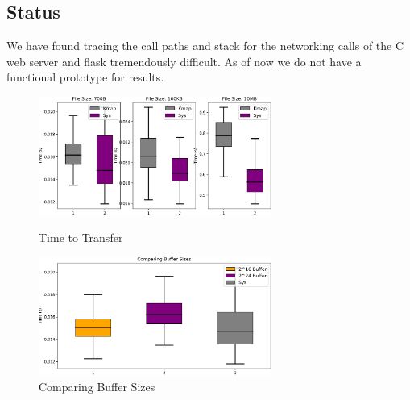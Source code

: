 \subsection{\sysname Status}
We have found tracing the call paths and stack for the networking calls of the C web server and flask tremendously difficult.
As of now we do not have a functional prototype for results.


\begin{figure}[!htb]
    \begin{minipage}{0.5\textwidth}
        \centering
        \includegraphics[keepaspectratio=true,width=3in]{figures/evaluation/results.png}
        \caption{Time to Transfer}
        \label{fig:results}
    \end{minipage}%
    \begin{minipage}{0.5\textwidth}
        \centering
        \includegraphics[keepaspectratio=true,width=3in]{figures/evaluation/buf_compare.png}
        \caption{Comparing \sysname Buffer Sizes}
        \label{fig:buf}
    \end{minipage}%
\end{figure}